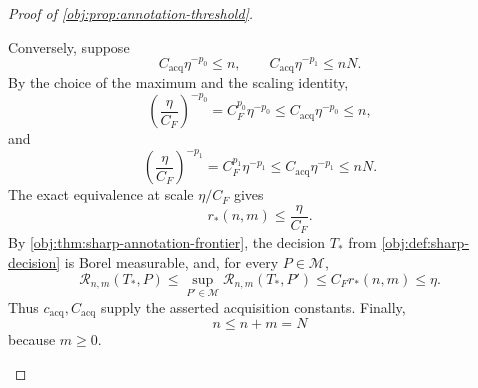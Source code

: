 \documentclass[11pt]{article}
\begin{document}
\begin{proof}[Proof of \cref{obj:prop:annotation-threshold}]
\begin{enumerate}
Conversely, suppose
\[
C_{\mathrm{acq}}\eta^{-p_0}\le n,
\qquad
C_{\mathrm{acq}}\eta^{-p_1}\le nN.
\]
By the choice of the maximum and the scaling identity,
\[
\left(\frac{\eta}{C_F}\right)^{-p_0}
=C_F^{p_0}\eta^{-p_0}
\le C_{\mathrm{acq}}\eta^{-p_0}\le n,
\]
and
\[
\left(\frac{\eta}{C_F}\right)^{-p_1}
=C_F^{p_1}\eta^{-p_1}
\le C_{\mathrm{acq}}\eta^{-p_1}\le nN.
\]
The exact equivalence at scale \(\eta/C_F\) gives
\[
r_*(n,m)\le\frac{\eta}{C_F}.
\]
By \cref{obj:thm:sharp-annotation-frontier}, the decision \(T_*\) from
\cref{obj:def:sharp-decision} is Borel measurable, and, for every \(P\in\mathcal M\),
\[
\mathcal R_{n,m}(T_*,P)
\le\sup_{P'\in\mathcal M}\mathcal R_{n,m}(T_*,P')
\le C_F r_*(n,m)
\le\eta.
\]
Thus \(c_{\mathrm{acq}},C_{\mathrm{acq}}\) supply the asserted acquisition constants. Finally,
\[
n\le n+m=N
\]
because \(m\ge0\).
\end{enumerate}
\end{proof}




\end{document}

